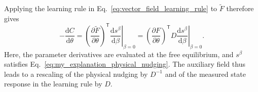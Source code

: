 \documentclass{article}
\begin{document}
Applying the learning rule in Eq.~\eqref{eq:vector_field_learning_rule}
to $\widetilde F$ therefore gives
\begin{equation}
-\frac{\mathrm dC}{\mathrm d\theta}
=
\left(\frac{\partial\widetilde F}{\partial\theta}\right)^{\mathsf T}
\left.\frac{\mathrm ds^\beta}{\mathrm d\beta}\right|_{\beta=0}
=
\left(\frac{\partial F}{\partial\theta}\right)^{\mathsf T}D
\left.\frac{\mathrm ds^\beta}{\mathrm d\beta}\right|_{\beta=0}.
\label{eq:my_explanation_learning_rule}
\end{equation}
Here, the parameter derivatives are evaluated at the free equilibrium,
and $s^\beta$ satisfies Eq.~\eqref{eq:my_explanation_physical_nudging}.
The auxiliary field thus leads to a rescaling of the physical nudging by
$D^{-1}$ and of the measured state response in the learning rule by $D$.
\end{document}
